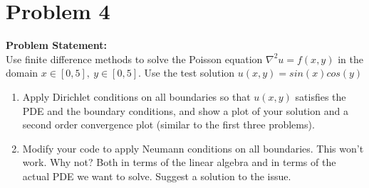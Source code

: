 \documentclass[12pt]{article}
\begin{document}
\section{Problem 4}
 \begin{tcolorbox}
        \textbf{Problem Statement:}\\
        Use finite difference methods to solve the Poisson equation $\nabla^2u = f (x, y)$ in the domain $x \in [0, 5],\ y \in [0, 5]$. Use the test solution $u(x, y) = sin(x) cos(y)$
        \begin{enumerate}
            \item Apply Dirichlet conditions on all boundaries so that $u(x, y)$ satisfies the PDE and the boundary conditions, and show a plot of your solution and a second order convergence plot (similar to the first three problems).
            \item Modify your code to apply Neumann conditions on all boundaries. This won’t work. Why not? Both in terms of the linear algebra and in terms of the actual PDE we want to solve. Suggest a solution to the issue.
        \end{enumerate}
            \end{tcolorbox}
    
\end{document}
